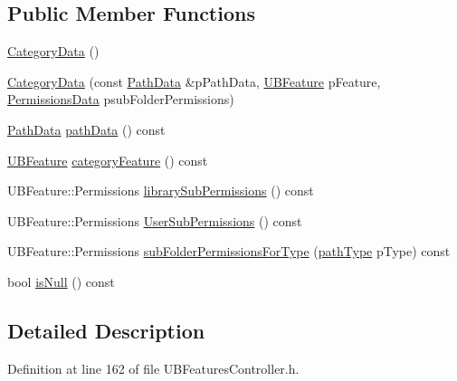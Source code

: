 \subsection*{Public Member Functions}
\begin{DoxyCompactItemize}
\item 
\hyperlink{struct_category_data_aa43f703a281f1278bb1705dc80c54261}{Category\-Data} ()
\item 
\hyperlink{struct_category_data_a2cdce5a0c3cf67e4b836fa1c6812581b}{Category\-Data} (const \hyperlink{struct_category_data_1_1_path_data}{Path\-Data} \&p\-Path\-Data, \hyperlink{class_u_b_feature}{U\-B\-Feature} p\-Feature, \hyperlink{struct_category_data_1_1_permissions_data}{Permissions\-Data} psub\-Folder\-Permissions)
\item 
\hyperlink{struct_category_data_1_1_path_data}{Path\-Data} \hyperlink{struct_category_data_ae5da36a3b7327e15fd29b87c20e6ac39}{path\-Data} () const 
\item 
\hyperlink{class_u_b_feature}{U\-B\-Feature} \hyperlink{struct_category_data_a12f08c37bc3241d3346228a5b262c4fa}{category\-Feature} () const 
\item 
U\-B\-Feature\-::\-Permissions \hyperlink{struct_category_data_a150b25038b995956b89896ac8f66886e}{library\-Sub\-Permissions} () const 
\item 
U\-B\-Feature\-::\-Permissions \hyperlink{struct_category_data_a9b8921537cdfd9b9523b451b1630fa30}{User\-Sub\-Permissions} () const 
\item 
U\-B\-Feature\-::\-Permissions \hyperlink{struct_category_data_ae0b01c9f7beb03243dbe07a9c209e028}{sub\-Folder\-Permissions\-For\-Type} (\hyperlink{struct_category_data_a69249ca5f66736ffb9fb8136d012030a}{path\-Type} p\-Type) const 
\item 
bool \hyperlink{struct_category_data_a23a8249beaef2e6ab2a8e6bda8e175a6}{is\-Null} () const 
\end{DoxyCompactItemize}


\subsection{Detailed Description}


Definition at line 162 of file U\-B\-Features\-Controller.\-h.



